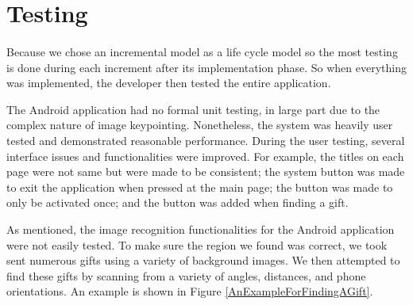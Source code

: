 \section{Testing}												
\label{sec:Testing}
\paragraph{} Because we chose an incremental model as a life cycle model so the most testing is done during each increment after its implementation phase. So when everything was implemented, the developer then tested the entire application.
\par The Android application had no formal unit testing, in large part due to the complex nature of image keypointing.  Nonetheless, the system was heavily user tested and demonstrated reasonable performance. During the user testing, several interface issues and functionalities were improved. For example, the titles on each page were not same but were made to be consistent; the system  button was made to exit the application when pressed at the main page; the  button was made to only be activated once; and the  button was added when finding a gift.  
\par As mentioned, the image recognition functionalities for the Android application were not easily tested. To make sure the region we found was correct, we took sent numerous gifts using a variety of background images.  We then attempted to find these gifts by scanning from a variety of angles, distances, and phone orientations. An example is shown in Figure \ref{AnExampleForFindingAGift}.
